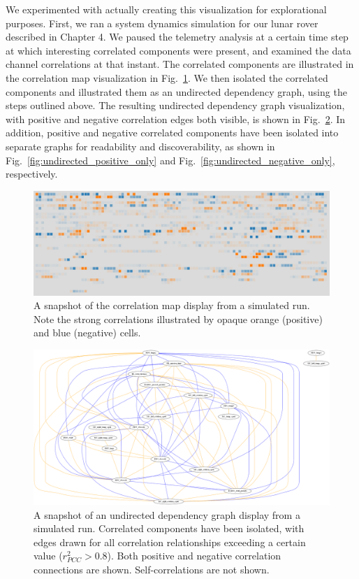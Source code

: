 We experimented with actually creating this visualization for explorational purposes. First, we ran a system dynamics simulation for our lunar rover described in Chapter 4. We paused the telemetry analysis at a certain time step at which interesting correlated components were present, and examined the data channel correlations at that instant. The correlated components are illustrated in the correlation map visualization in Fig.~\ref{fig:comparison_correlation_map}. We then isolated the correlated components and illustrated them as an undirected dependency graph, using the steps outlined above. The resulting undirected dependency graph visualization, with positive and negative correlation edges both visible, is shown in Fig.~\ref{fig:undirected_both}. In addition, positive and negative correlated components have been isolated into separate graphs for readability and discoverability, as shown in Fig.~\ref{fig:undirected_positive_only} and Fig.~\ref{fig:undirected_negative_only}, respectively.

\begin{figure}[h]
\centering
    \includegraphics[width=\columnwidth]{images/comparison_correlation_map.png}
    \caption{A snapshot of the correlation map display from a simulated run. Note the strong correlations illustrated by opaque orange (positive) and blue (negative) cells.}
    \label{fig:comparison_correlation_map}
\end{figure}

\begin{figure}[h]
\centering
    \includegraphics[width=\columnwidth]{images/undirected_both.png}
    \caption{A snapshot of an undirected dependency graph display from a simulated run. Correlated components have been isolated, with edges drawn for all correlation relationships exceeding a certain value ($r_{PCC}^{2} > 0.8$). Both positive and negative correlation connections are shown. Self-correlations are not shown.}
    \label{fig:undirected_both}
\end{figure}


